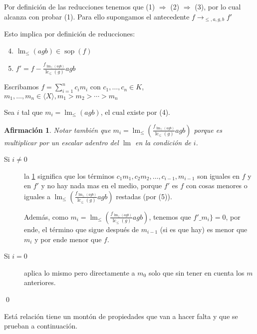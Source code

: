 \documentclass{report}
\theoremstyle{customstyle}
\renewenvironment{proof}[1][\proofname]{{\bfseries #1: }}{\qed} %
\theoremstyle{factstyle}
\newtheorem{fact}{Afirmación}[theorem]
\DeclareMathOperator{\sop}{sop}
\DeclareMathOperator{\lm}{lm}
\DeclareMathOperator{\lc}{lc}
\begin{document}
  \begin{proof}
  Por definición de las reducciones tenemos que (1) $⇒$ (2) $⇒$ (3), por lo cual alcanza con probar (1). Para ello supongamos el antecedente $f →_{≤, a, g, b} f'$

  Esto implica por definición de reducciones:
  \begin{enumerate}
    \setcounter{enumi}{3}
    \item $\lm_≤(agb) ∈ \sop(f)$
    \item $f' = f - \frac{f_{\lm_≤(agb)}}{\lc_≤(g)}agb$
  \end{enumerate}

  Escribamos $f = ∑_{i = 1}^n c_i m_i$ con $c_1, …, c_n ∈ K$, $m_1, …, m_n ∈ ⟨X⟩, m_1 > m_2 > ⋯ > m_n$

  Sea $i$ tal que $m_i = \lm_≤(agb)$, el cual existe por (4).

  \begin{fact}\label{fact:→ achican:3}
    Notar también que $m_i = \lm_≤(\frac{f_{\lm_≤(agb)}}{\lc_≤(g)}agb)$ porque es multiplicar por un escalar adentro del $\lm$ en la condición de $i$.
  \end{fact}
  \begin{description}
    \item[Si $i ≠ 0$] la \cref{fact:→ achican:3} significa que los términos $c_1 m_1, c_2 m_2, …, c_{i-1}, m_{i-1}$ son iguales en $f$ y en $f'$ y no hay nada mas en el medio, porque $f'$ es $f$ con cosas menores o iguales a $\lm_≤(\frac{f_{\lm_≤(agb)}}{\lc_≤(g)}agb)$ restadas (por (5)).

    Además, como $m_i = \lm_≤(\frac{f_{\lm_≤(agb)}}{\lc_≤(g)}agb)$, tenemos que $f'\_m_i\} = 0$, por ende, el término que sigue después de $m_{i-1}$ (si es que hay) es menor que $m_i$ y por ende menor que $f$.

    \item[Si $i = 0$] aplica lo mismo pero directamente a $m_0$ solo que sin tener en cuenta los $m$ anteriores.
  \end{description}

\end{proof}

Está relación tiene un montón de propiedades que van a hacer falta y que se prueban a continuación.
\end{document}
